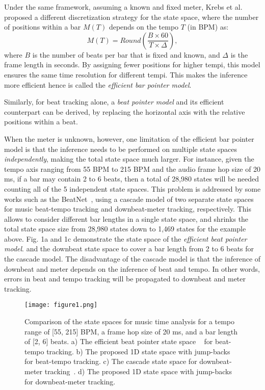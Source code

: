 \documentclass{article}
\begin{document}
Under the same framework, assuming a known and fixed meter, Krebs et al.~\cite{Krebs:1} proposed a different discretization strategy for the state space, where the number of positions within a bar $M(T)$ depends on the tempo $T$ (in BPM) as:
\begin{equation}
M(T)= Round (\frac{ B\times 60 }{T\times\Delta}),
\end{equation}
where $B$ is the number of beats per bar that is fixed and known, and $\Delta$ is the frame length in seconds. By assigning fewer positions for higher tempi, this model ensures 
the same time resolution for different tempi.
This makes the inference more efficient hence is called the \textit{efficient bar pointer model}. 

Similarly, for beat tracking alone, a \textit{beat pointer model} and its efficient counterpart can be derived, by replacing the horizontal axis with the relative positions within a beat.





When the meter is unknown, however, one limitation of the efficient bar pointer model is that 
the inference needs to be performed on multiple state spaces \textit{independently}, making the total state space much larger.
For instance, given the tempo axis ranging from 55 BPM to 215 BPM and the audio frame hop size of 20 ms, if a bar may contain 2 to 6 beats, then a total of 28,980 states will be needed counting all of the 5 independent state spaces. This problem is addressed by some works such as the BeatNet~\cite{Heydari:2}, using a cascade model of two separate state spaces for music beat-tempo tracking and downbeat-meter tracking, respectively. 
This allows to consider different bar lengths in a single state space, and shrinks the total state space size from 28,980 states down to 1,469 states for the example above. Fig. 1a and 1c demonstrate the state space of the \textit{efficient beat pointer model}. and the downbeat state space to cover a bar length from 2 to 6 beats for the cascade model. The disadvantage of the cascade model is that the inference of downbeat and meter depends on the inference of beat and tempo. In other words, errors in beat and tempo tracking will be propagated to downbeat and meter tracking.
 
\begin{figure*}[htbp]
 \centerline{
 \texttt{[image: figure1.png]}}
\caption{Comparison of the state spaces for music time analysis for a tempo range of [55, 215] BPM, a frame hop size of 20 ms, and a bar length of [2, 6] beats. a) The efficient beat pointer state space ~\cite{Krebs:1} for beat-tempo tracking. b) The proposed 1D state space with jump-backs for beat-tempo tracking. c) The cascade state space for downbeat-meter tracking~\cite{Heydari:2}. d) The proposed 1D state space with jump-backs for downbeat-meter tracking.}
 \label{fig1}
\end{figure*}
\end{document}
